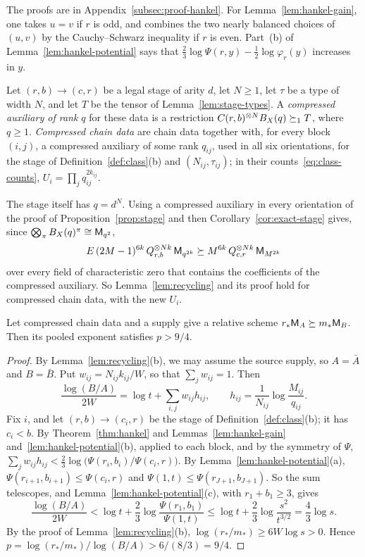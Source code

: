 The proofs are in Appendix~\ref{subsec:proof-hankel}. For
Lemma~\ref{lem:hankel-gain}, one takes \(u=v\) if \(r\) is odd, and
combines the two nearly balanced choices of \((u,v)\) by the
Cauchy--Schwarz inequality if \(r\) is even. Part~(b) of
Lemma~\ref{lem:hankel-potential} says that
\(\frac23\log\Psi(r,y)-\frac12\log\varphi_r(y)\) increases in \(y\).

\begin{definition}\label{def:compressed}
Let \((r,b)\to(c,r)\) be a legal stage of arity \(d\), let \(N\ge1\),
let \(\tau\) be a type of width \(N\), and let \(T\) be the tensor of
Lemma~\ref{lem:stage-types}. A \emph{compressed auxiliary of rank \(q\)}
for these data is a restriction \(C(r,b)^{\otimes N}B_X(q)\succeq_1T\),
where \(q\ge1\). \emph{Compressed chain data} are chain data together
with, for every block \((i,j)\), a compressed auxiliary of some rank
\(q_{ij}\), used in all six orientations, for the stage of
Definition~\ref{def:class}(b) and \((N_{ij},\tau_{ij})\); in their
counts~\eqref{eq:class-counts}, \(U_i=\prod_jq_{ij}^{2k_{ij}}\).
\end{definition}

The stage itself has \(q=d^N\). Using a compressed auxiliary in every
orientation of the proof of Proposition~\ref{prop:stage} and then
Corollary~\ref{cor:exact-stage} gives, since
\(\bigotimes_\pi B_X(q)^\pi\cong\mathsf M_{q^2}\),
\[
 E\,(2M-1)^{6k}\,Q_{r,b}^{\otimes Nk}\,\mathsf M_{q^{2k}}\succeq
 M^{6k}\,Q_{c,r}^{\otimes Nk}\,\mathsf M_{M^{2k}}
\]
over every field of characteristic zero that contains the coefficients
of the compressed auxiliary. So Lemma~\ref{lem:recycling} and its proof
hold for compressed chain data, with the new \(U_i\).

\begin{corollary}\label{cor:compression-limit}
Let compressed chain data and a supply give a relative scheme
\(r_*\mathsf M_A\succeq m_*\mathsf M_B\). Then its pooled exponent satisfies
\(p>9/4\).
\end{corollary}

\begin{proof}
By Lemma~\ref{lem:recycling}(b), we may assume the source supply, so
\(A=\bar A\) and \(B=\bar B\). Put \(w_{ij}=N_{ij}k_{ij}/W\), so that
\(\sum_jw_{ij}=1\). Then
\[
 \frac{\log(B/A)}{2W}=\log t+\sum_{i,j}w_{ij}h_{ij},\qquad
 h_{ij}=\frac1{N_{ij}}\log\frac{M_{ij}}{q_{ij}} .
\]
Fix \(i\), and let \((r,b)\to(c_i,r)\) be the stage of
Definition~\ref{def:class}(b); it has \(c_i<b\). By
Theorem~\ref{thm:hankel} and Lemmas~\ref{lem:hankel-gain}
and~\ref{lem:hankel-potential}(b), applied to each block, and by the
symmetry of \(\Psi\),
\(\sum_jw_{ij}h_{ij}<\frac23\log\bigl(\Psi(r_i,b_i)/\Psi(c_i,r)\bigr)\).
By Lemma~\ref{lem:hankel-potential}(a),
\(\Psi(r_{i+1},b_{i+1})\le\Psi(c_i,r)\) and
\(\Psi(1,t)\le\Psi(r_{J+1},b_{J+1})\). So the sum telescopes, and
Lemma~\ref{lem:hankel-potential}(c), with \(r_1+b_1\ge3\), gives
\[
 \frac{\log(B/A)}{2W}<\log t+\frac23\log\frac{\Psi(r_1,b_1)}{\Psi(1,t)}
 \le\log t+\frac23\log\frac{s^2}{t^{3/2}}=\frac43\log s .
\]
By the proof of Lemma~\ref{lem:recycling}(b),
\(\log(r_*/m_*)\ge6W\log s>0\). Hence
\(p=\log(r_*/m_*)/\log(B/A)>6/(8/3)=9/4\).
\end{proof}

